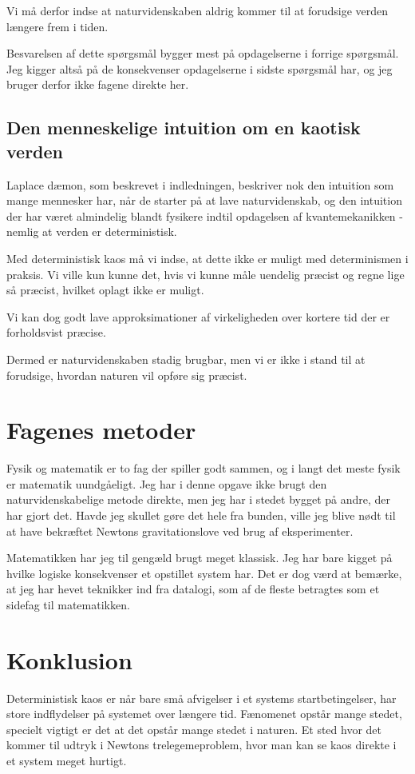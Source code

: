\documentclass[12pt,a4paper]{article}
\theoremstyle{break}
\theoremstyle{nonumberplain}
\begin{document}
Vi må derfor indse at naturvidenskaben aldrig kommer til at forudsige verden længere frem i tiden. 

Besvarelsen af dette spørgsmål bygger mest på opdagelserne i forrige spørgsmål. 
Jeg kigger altså på de konsekvenser opdagelserne i sidste spørgsmål har, og jeg bruger derfor ikke fagene direkte her. 

\subsection{Den menneskelige intuition om en kaotisk verden}
Laplace dæmon, som beskrevet i indledningen, beskriver nok den intuition som mange mennesker har, når de starter på at lave naturvidenskab, og den intuition der har været almindelig blandt fysikere indtil opdagelsen af kvantemekanikken - nemlig at verden er deterministisk.

Med deterministisk kaos må vi indse, at dette ikke er muligt med determinismen i praksis. 
Vi ville kun kunne det, hvis vi kunne måle uendelig præcist og regne lige så præcist, hvilket oplagt ikke er muligt.

Vi kan dog godt lave approksimationer af virkeligheden over kortere tid der er forholdsvist præcise. 

Dermed er naturvidenskaben stadig brugbar, men vi er ikke i stand til at forudsige, hvordan naturen vil opføre sig præcist.

\section{Fagenes metoder}
Fysik og matematik er to fag der spiller godt sammen, og i langt det meste fysik er matematik uundgåeligt. 
Jeg har i denne opgave ikke brugt den naturvidenskabelige metode direkte, men jeg har i stedet bygget på andre, der har gjort det. 
Havde jeg skullet gøre det hele fra bunden, ville jeg blive nødt til at have bekræftet Newtons gravitationslove ved brug af eksperimenter. 

Matematikken har jeg til gengæld brugt meget klassisk. 
Jeg har bare kigget på hvilke logiske konsekvenser et opstillet system har. 
Det er dog værd at bemærke, at jeg har hevet teknikker ind fra datalogi, som af de fleste betragtes som et sidefag til matematikken. 

\section{Konklusion}
Deterministisk kaos er når bare små afvigelser i et systems startbetingelser, har store indflydelser på systemet over længere tid.
Fænomenet opstår mange stedet, specielt vigtigt er det at det opstår mange stedet i naturen. 
Et sted hvor det kommer til udtryk i Newtons trelegemeproblem, hvor man kan se kaos direkte i et system meget hurtigt.
\end{document}
